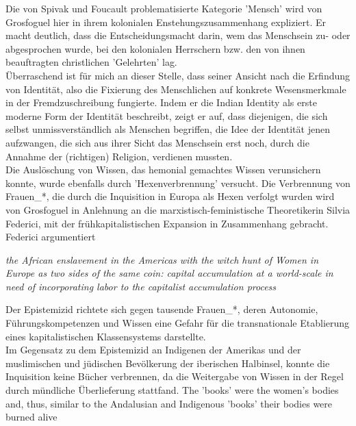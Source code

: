 \noindent Die von Spivak und Foucault
problematisierte Kategorie 'Mensch' wird von Grosfoguel hier in ihrem
kolonialen Enstehungszusammenhang expliziert. Er macht deutlich, dass die
Entscheidungsmacht darin, wem das Menschsein zu- oder abgesprochen wurde, bei
den kolonialen Herrschern bzw. den von ihnen beauftragten christlichen
'Gelehrten' lag. \\
Überraschend ist für mich an dieser Stelle, dass seiner
Ansicht nach die Erfindung von Identität, also die Fixierung des Menschlichen
auf konkrete Wesensmerkmale in der Fremdzuschreibung fungierte. Indem er die
\glqq Indian Identity \grqq als erste moderne Form der Identität beschreibt, zeigt er
auf, dass diejenigen, die sich selbst unmissverständlich als Menschen
begriffen, die Idee der Identität jenen aufzwangen, die sich aus ihrer Sicht
das Menschsein erst noch, durch die Annahme der (richtigen) Religion, verdienen
mussten.\\

\noindent Die Auslöschung von Wissen, das hemonial gemachtes Wissen verunsichern konnte,
wurde ebenfalls durch 'Hexenverbrennung'  versucht. Die Verbrennung von
Frauen\_*, die durch die Inquisition in Europa als Hexen verfolgt wurden wird
von Grosfoguel in Anlehnung an die marxistisch-feministische Theoretikerin
Silvia Federici, mit der frühkapitalistischen Expansion in Zusammenhang
gebracht. Federici argumentiert
\begin{myenv}
  \textit{\glqq the African enslavement in the Americas with the witch hunt of
    Women in Europe as two sides of the same coin: capital accumulation at a
    world-scale in need of incorporating labor to the capitalist accumulation
  process  \grqq \footnotemark {} }
\end{myenv}
Der Epistemizid richtete sich gegen tausende Frauen\_*, deren \glqq Autonomie,
Führungskompetenzen und Wissen \grqq \footnotemark {} 
eine Gefahr für die transnationale Etablierung
eines kapitalistischen Klassensystems darstellte.\\
Im Gegensatz zu dem Epistemizid an Indigenen der Amerikas und der muslimischen
und jüdischen Bevölkerung der iberischen Halbinsel, konnte die Inquisition
keine Bücher verbrennen, da die Weitergabe von Wissen in der Regel durch
mündliche Überlieferung stattfand. \glqq The 'books' were the women’s bodies and,
thus, similar to the Andalusian and Indigenous 'books' their bodies were burned
alive \grqq \footnotemark {}\\

